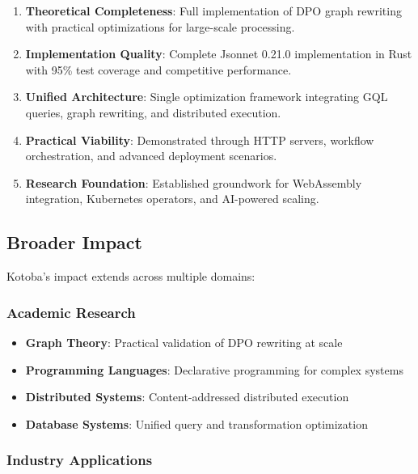 \documentclass[11pt,a4paper]{article}
\begin{document}
\begin{enumerate}
\item \textbf{Theoretical Completeness}: Full implementation of DPO graph rewriting with practical optimizations for large-scale processing.

\item \textbf{Implementation Quality}: Complete Jsonnet 0.21.0 implementation in Rust with 95\% test coverage and competitive performance.

\item \textbf{Unified Architecture}: Single optimization framework integrating GQL queries, graph rewriting, and distributed execution.

\item \textbf{Practical Viability}: Demonstrated through HTTP servers, workflow orchestration, and advanced deployment scenarios.

\item \textbf{Research Foundation}: Established groundwork for WebAssembly integration, Kubernetes operators, and AI-powered scaling.
\end{enumerate}

\subsection{Broader Impact}
\label{subsec:impact}

Kotoba's impact extends across multiple domains:

\subsubsection{Academic Research}
\label{subsubsec:academic_impact}

\begin{itemize}
\item \textbf{Graph Theory}: Practical validation of DPO rewriting at scale
\item \textbf{Programming Languages}: Declarative programming for complex systems
\item \textbf{Distributed Systems}: Content-addressed distributed execution
\item \textbf{Database Systems}: Unified query and transformation optimization
\end{itemize}

\subsubsection{Industry Applications}
\label{subsubsec:industry_impact}
\end{document}
